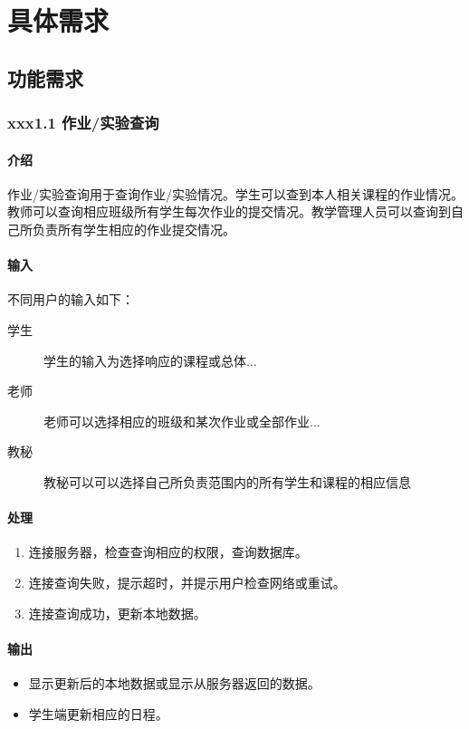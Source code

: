 \chapter{具体需求}
  \section{功能需求}
    \subsection{xxx1.1 作业/实验查询}
      \subsubsection{介绍}
      作业/实验查询用于查询作业/实验情况。学生可以查到本人相关课程的作业情况。教师可以查询相应班级所有学生每次作业的提交情况。教学管理人员可以查询到自己所负责所有学生相应的作业提交情况。
      \subsubsection{输入}
      不同用户的输入如下：
      \begin{center}\begin{description}
        \item[学生] 学生的输入为选择响应的课程或总体...
        \item[老师] 老师可以选择相应的班级和某次作业或全部作业...
        \item[教秘] 教秘可以可以选择自己所负责范围内的所有学生和课程的相应信息
      \end{description}\end{center}
      \subsubsection{处理}
      \begin{enumerate}
        \item 连接服务器，检查查询相应的权限，查询数据库。
        \item 连接查询失败，提示超时，并提示用户检查网络或重试。
        \item 连接查询成功，更新本地数据。
      \end{enumerate}
      \subsubsection{输出}
      \begin{itemize}
        \item 显示更新后的本地数据或显示从服务器返回的数据。
        \item 学生端更新相应的日程。
      \end{itemize}

